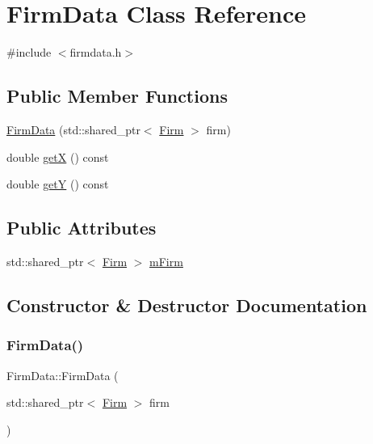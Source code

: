 \hypertarget{class_firm_data}{}\section{Firm\+Data Class Reference}
\label{class_firm_data}


{\ttfamily \#include $<$firmdata.\+h$>$}

\subsection*{Public Member Functions}
\begin{DoxyCompactItemize}
\item 
\mbox{\hyperlink{class_firm_data_a74f2c02264955dacd6e8c87d96d9acd8}{Firm\+Data}} (std\+::shared\+\_\+ptr$<$ \mbox{\hyperlink{class_firm}{Firm}} $>$ firm)
\item 
double \mbox{\hyperlink{class_firm_data_afbab11ece8edfa9b9bc31bbaccaebe87}{getX}} () const
\item 
double \mbox{\hyperlink{class_firm_data_a5b22653ebfa412651e2c1bb09dd093fb}{getY}} () const
\end{DoxyCompactItemize}
\subsection*{Public Attributes}
\begin{DoxyCompactItemize}
\item 
std\+::shared\+\_\+ptr$<$ \mbox{\hyperlink{class_firm}{Firm}} $>$ \mbox{\hyperlink{class_firm_data_ac3bc4405bf040d4b3b0d4cd7f5fcf3e6}{m\+Firm}}
\end{DoxyCompactItemize}


\subsection{Constructor \& Destructor Documentation}
\mbox{\label{class_firm_data_a74f2c02264955dacd6e8c87d96d9acd8}} 
\subsubsection{\texorpdfstring{FirmData()}{FirmData()}}
{\footnotesize\ttfamily Firm\+Data\+::\+Firm\+Data (\begin{DoxyParamCaption}\item[{std\+::shared\+\_\+ptr$<$ \mbox{\hyperlink{class_firm}{Firm}} $>$}]{firm }\end{DoxyParamCaption})}



